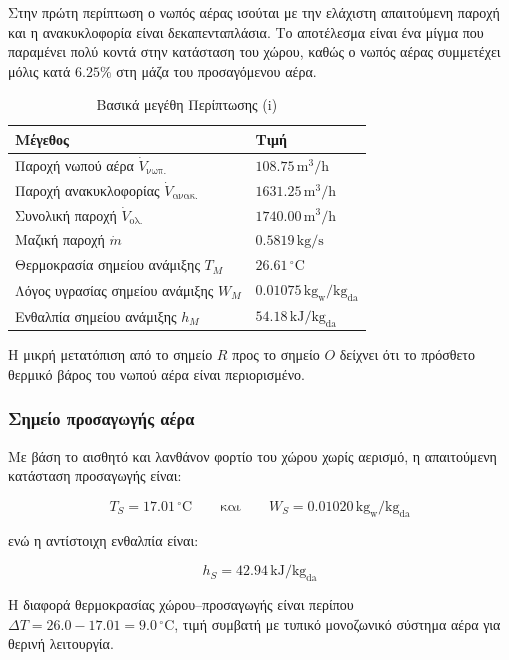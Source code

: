 \documentclass[12pt,a4paper]{article}
\begin{document}
Στην πρώτη περίπτωση ο νωπός αέρας ισούται με την ελάχιστη απαιτούμενη παροχή και
η ανακυκλοφορία είναι δεκαπενταπλάσια. Το αποτέλεσμα είναι ένα μίγμα που παραμένει
πολύ κοντά στην κατάσταση του χώρου, καθώς ο νωπός αέρας συμμετέχει μόλις κατά
\(6.25\%\) στη μάζα του προσαγόμενου αέρα.

\begin{table}[H]
\centering
\caption{Βασικά μεγέθη Περίπτωσης (i)}
\begin{tabularx}{\textwidth}{L C{4.3cm}}
\toprule
\textbf{Μέγεθος} & \textbf{Τιμή} \\
\midrule
Παροχή νωπού αέρα \(\dot V_{\text{νωπ.}}\) & \(108.75\,\mathrm{m^3/h}\) \\
Παροχή ανακυκλοφορίας \(\dot V_{\text{ανακ.}}\) & \(1631.25\,\mathrm{m^3/h}\) \\
Συνολική παροχή \(\dot V_{\text{ολ.}}\) & \(1740.00\,\mathrm{m^3/h}\) \\
Μαζική παροχή \(\dot m\) & \(0.5819\,\mathrm{kg/s}\) \\
\midrule
Θερμοκρασία σημείου ανάμιξης \(T_M\) & \(26.61\,^\circ\mathrm{C}\) \\
Λόγος υγρασίας σημείου ανάμιξης \(W_M\) & \(0.01075\,\mathrm{kg_w/kg_{da}}\) \\
Ενθαλπία σημείου ανάμιξης \(h_M\) & \(54.18\,\mathrm{kJ/kg_{da}}\) \\
\bottomrule
\end{tabularx}
\end{table}

Η μικρή μετατόπιση από το σημείο \(R\) προς το σημείο \(O\) δείχνει ότι το
πρόσθετο θερμικό βάρος του νωπού αέρα είναι περιορισμένο.

\subsubsection{Σημείο προσαγωγής αέρα}

Με βάση το αισθητό και λανθάνον φορτίο του χώρου χωρίς αερισμό, η απαιτούμενη
κατάσταση προσαγωγής είναι:

\[
T_S = 17.01\,^\circ\mathrm{C}
\qquad\text{και}\qquad
W_S = 0.01020\,\mathrm{kg_w/kg_{da}}
\]

ενώ η αντίστοιχη ενθαλπία είναι:

\[
h_S = 42.94\,\mathrm{kJ/kg_{da}}
\]

Η διαφορά θερμοκρασίας χώρου--προσαγωγής είναι περίπου
\(\Delta T = 26.0 - 17.01 = 9.0\,^\circ\mathrm{C}\), τιμή συμβατή με τυπικό
μονοζωνικό σύστημα αέρα για θερινή λειτουργία.
\end{document}
